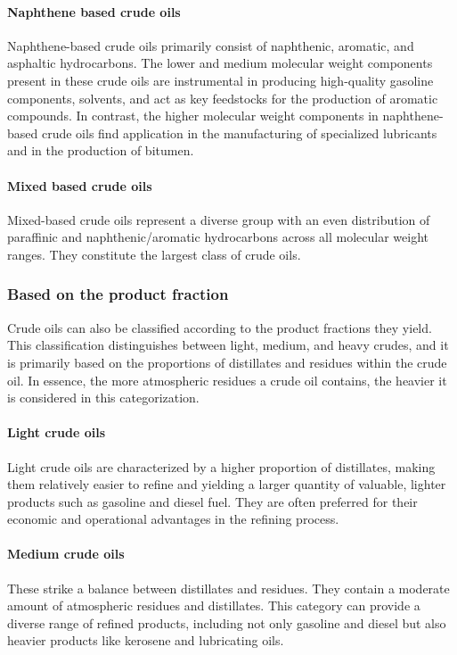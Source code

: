 \paragraph{Naphthene based crude oils}
Naphthene-based crude oils primarily consist of naphthenic, aromatic, and asphaltic hydrocarbons.
The lower and medium molecular weight components present in these crude oils are instrumental in producing high-quality gasoline components, solvents, and act as key feedstocks for the production of aromatic compounds.
In contrast, the higher molecular weight components in naphthene-based crude oils find application in the manufacturing of specialized lubricants and in the production of bitumen.

\paragraph{Mixed based crude oils}
Mixed-based crude oils represent a diverse group with an even distribution of paraffinic and naphthenic/aromatic hydrocarbons across all molecular weight ranges.
They constitute the largest class of crude oils.

\subsubsection{Based on the product fraction}

Crude oils can also be classified according to the product fractions they yield.
This classification distinguishes between light, medium, and heavy crudes, and it is primarily based on the proportions of distillates and residues within the crude oil.
In essence, the more atmospheric residues a crude oil contains, the heavier it is considered in this categorization.

\paragraph{Light crude oils} Light crude oils are characterized by a higher proportion of distillates, making them relatively easier to refine and yielding a larger quantity of valuable, lighter products such as gasoline and diesel fuel.
They are often preferred for their economic and operational advantages in the refining process.

\paragraph{Medium crude oils} These strike a balance between distillates and residues.
They contain a moderate amount of atmospheric residues and distillates.
This category can provide a diverse range of refined products, including not only gasoline and diesel but also heavier products like kerosene and lubricating oils.

